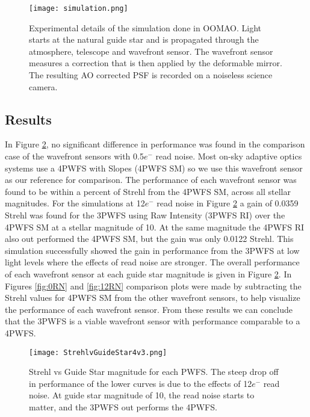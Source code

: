 \begin{figure}
    \centering
    \texttt{[image: simulation.png]}
    \caption{Experimental details of the simulation done in OOMAO. Light starts at the natural guide star and is propagated through the atmosphere, telescope and wavefront sensor. The wavefront sensor measures a correction that is then applied by the deformable mirror.  The resulting AO corrected PSF is recorded on a noiseless science camera. }
    \label{fig:simulationl}
\end{figure}

\subsection{Results}

In Figure \ref{fig:overall}, no significant difference in performance was found in the comparison case of the wavefront sensors with 0.5$e^-$ read noise. Most on-sky adaptive optics systems use a 4PWFS with Slopes (4PWFS SM) so we use this wavefront sensor as our reference for comparison. The performance of each wavefront sensor was found to be within a percent of Strehl from the 4PWFS SM, across all stellar magnitudes. For the simulations at 12$e^-$ read noise in Figure \ref{fig:overall} a gain of 0.0359 Strehl was found for the 3PWFS using Raw Intensity (3PWFS RI) over the 4PWFS SM at a stellar magnitude of 10. At the same magnitude the 4PWFS RI also out performed the 4PWFS SM, but the gain was only 0.0122 Strehl. This simulation successfully showed the gain in performance from the 3PWFS at low light levels where the effects of read noise are stronger. The overall performance of each wavefront sensor at each guide star magnitude is given in Figure \ref{fig:overall}. In Figures \ref{fig:0RN} and \ref{fig:12RN} comparison plots were made by subtracting the Strehl values for 4PWFS SM from the other wavefront sensors, to help visualize the performance of each wavefront sensor. From these results we can conclude that the 3PWFS is a viable wavefront sensor with performance comparable to a 4PWFS.


\begin{figure}[h]
    \centering
    \texttt{[image: StrehlvGuideStar4v3.png]}
    \caption{Strehl vs Guide Star magnitude for each PWFS. The steep drop off in performance of the lower curves is due to the effects of 12$e^-$ read noise. At guide star magnitude of 10, the read noise starts to matter, and the 3PWFS out performs the 4PWFS. }
    \label{fig:overall}
\end{figure}


